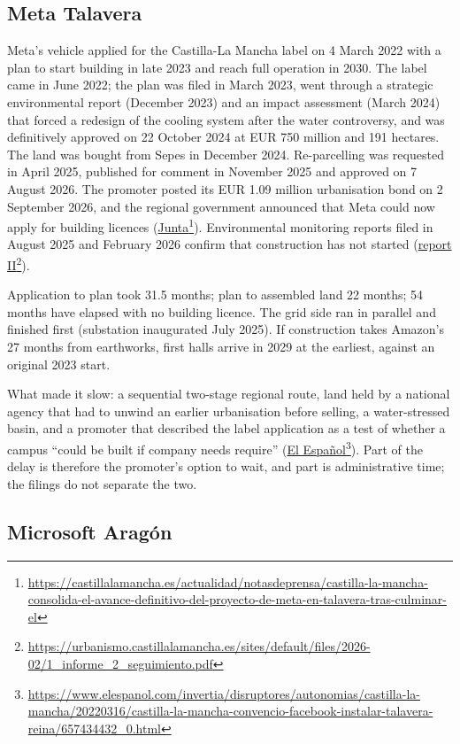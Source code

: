 \documentclass[11pt]{article}
\newcommand{\src}[2]{\href{#1}{#2}\footnote{\url{#1}}}
\begin{document}
\subsection{Meta Talavera}

Meta's vehicle applied for the Castilla-La Mancha label on 4 March 2022 with a plan to start building in late 2023 and reach full operation in 2030. The label came in June 2022; the plan was filed in March 2023, went through a strategic environmental report (December 2023) and an impact assessment (March 2024) that forced a redesign of the cooling system after the water controversy, and was definitively approved on 22 October 2024 at EUR 750 million and 191 hectares. The land was bought from Sepes in December 2024. Re-parcelling was requested in April 2025, published for comment in November 2025 and approved on 7 August 2026. The promoter posted its EUR 1.09 million urbanisation bond on 2 September 2026, and the regional government announced that Meta could now apply for building licences (\src{https://castillalamancha.es/actualidad/notasdeprensa/castilla-la-mancha-consolida-el-avance-definitivo-del-proyecto-de-meta-en-talavera-tras-culminar-el}{Junta}). Environmental monitoring reports filed in August 2025 and February 2026 confirm that construction has not started (\src{https://urbanismo.castillalamancha.es/sites/default/files/2026-02/1_informe_2_seguimiento.pdf}{report II}).

Application to plan took 31.5 months; plan to assembled land 22 months; 54 months have elapsed with no building licence. The grid side ran in parallel and finished first (substation inaugurated July 2025). If construction takes Amazon's 27 months from earthworks, first halls arrive in 2029 at the earliest, against an original 2023 start.

What made it slow: a sequential two-stage regional route, land held by a national agency that had to unwind an earlier urbanisation before selling, a water-stressed basin, and a promoter that described the label application as a test of whether a campus ``could be built if company needs require'' (\src{https://www.elespanol.com/invertia/disruptores/autonomias/castilla-la-mancha/20220316/castilla-la-mancha-convencio-facebook-instalar-talavera-reina/657434432_0.html}{El Español}). Part of the delay is therefore the promoter's option to wait, and part is administrative time; the filings do not separate the two.

\subsection{Microsoft Aragón}
\end{document}
